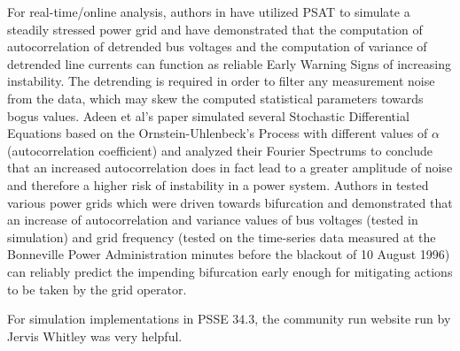 For real-time/online analysis, authors in \cite{ghanvati01} have utilized PSAT \cite{psatMilano} to simulate a steadily stressed power grid and have demonstrated that the computation of autocorrelation of detrended bus voltages and the computation  of variance of detrended line currents can function as reliable Early Warning Signs of increasing instability. The detrending is required in order to filter any measurement noise from the data, which may skew the computed statistical parameters towards bogus values. Adeen et al's paper \cite{adeen01} simulated several Stochastic Differential Equations based on the Ornstein-Uhlenbeck's Process with different values of $\alpha$ (autocorrelation coefficient) and analyzed their Fourier Spectrums to conclude that an increased autocorrelation does in fact lead to a greater amplitude of noise and therefore a higher risk of instability in a power system. Authors in \cite{sanchez01} tested various power grids which were driven towards bifurcation and demonstrated that an increase of autocorrelation and variance values of bus voltages (tested in simulation) and grid frequency (tested on the time-series data measured at the Bonneville Power Administration minutes before the blackout of 10 August 1996) can reliably predict the impending bifurcation early enough for mitigating actions to be taken by the grid operator.

For simulation implementations in PSSE 34.3, the community run website run by Jervis Whitley \cite{psspyWebsite} was very helpful.